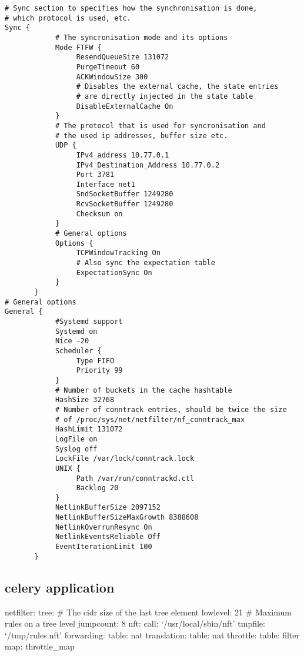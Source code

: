 \begin{verbatim}
# Sync section to specifies how the synchronisation is done,
# which protocol is used, etc.
Sync {
            # The syncronisation mode and its options
            Mode FTFW {
                 ResendQueueSize 131072
                 PurgeTimeout 60
                 ACKWindowSize 300
                 # Disables the external cache, the state entries
                 # are directly injected in the state table
                 DisableExternalCache On
            }
            # The protocol that is used for syncronisation and
            # the used ip addresses, buffer size etc.
            UDP {
                 IPv4_address 10.77.0.1
                 IPv4_Destination_Address 10.77.0.2
                 Port 3781
                 Interface net1
                 SndSocketBuffer 1249280
                 RcvSocketBuffer 1249280
                 Checksum on
            }
            # General options
            Options {
                 TCPWindowTracking On
                 # Also sync the expectation table
                 ExpectationSync On
            }
       }
# General options
General {
            #Systemd support
            Systemd on
            Nice -20
            Scheduler {
                 Type FIFO
                 Priority 99
            }
            # Number of buckets in the cache hashtable
            HashSize 32768
            # Number of conntrack entries, should be twice the size
            # of /proc/sys/net/netfilter/nf_conntrack_max
            HashLimit 131072
            LogFile on
            Syslog off
            LockFile /var/lock/conntrack.lock
            UNIX {
                 Path /var/run/conntrackd.ctl
                 Backlog 20
            }
            NetlinkBufferSize 2097152
            NetlinkBufferSizeMaxGrowth 8388608
            NetlinkOverrunResync On
            NetlinkEventsReliable Off
            EventIterationLimit 100
       }
\end{verbatim}

\subsection{celery application}\label{celery-application}

netfilter: tree: \# The cidr size of the last tree element lowlevel: 21
\# Maximum rules on a tree level jumpcount: 8 nft: call:
`/usr/local/sbin/nft' tmpfile: `/tmp/rules.nft' forwarding: table: nat
translation: table: nat throttle: table: filter map: throttle\_map


